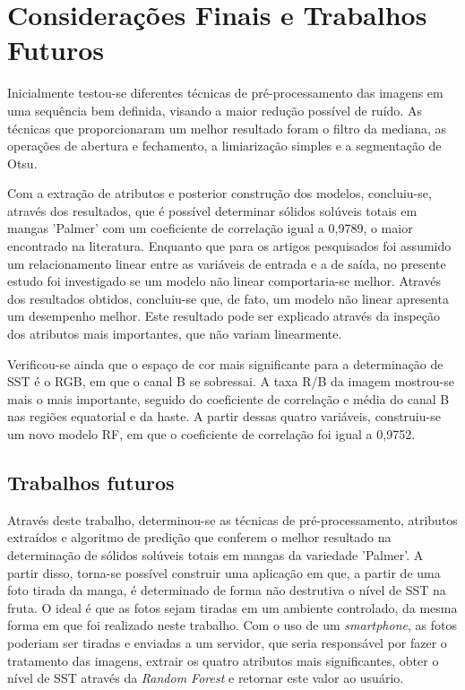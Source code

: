 \chapter{Considerações Finais e Trabalhos Futuros}

Inicialmente testou-se diferentes técnicas de pré-processamento das imagens em uma sequência bem definida, visando a maior redução possível de ruído. As técnicas que proporcionaram um melhor resultado foram o filtro da mediana, as operações de abertura e fechamento, a limiarização simples e a segmentação de Otsu.

Com a extração de atributos e posterior construção dos modelos, concluiu-se, através dos resultados, que é possível determinar sólidos solúveis totais em mangas 'Palmer' com um coeficiente de correlação igual a 0,9789, o maior encontrado na literatura. Enquanto que para os artigos pesquisados foi assumido um relacionamento linear entre as variáveis de entrada e a de saída, no presente estudo foi investigado se um modelo não linear comportaria-se melhor. Através dos resultados obtidos, concluiu-se que, de fato, um modelo não linear apresenta um desempenho melhor. Este resultado pode ser explicado através da inspeção dos atributos mais importantes, que não variam linearmente.

Verificou-se ainda que o espaço de cor mais significante para a determinação de SST é o RGB, em que o canal B se sobressai. A taxa R/B da imagem mostrou-se mais o mais importante, seguido do coeficiente de correlação e média do canal B nas regiões equatorial e da haste. A partir dessas quatro variáveis, construiu-se um novo modelo RF, em que o coeficiente de correlação foi igual a 0,9752.  
 
\section{Trabalhos futuros}

Através deste trabalho, determinou-se as técnicas de pré-processamento, atributos extraídos e algoritmo de predição que conferem o melhor resultado na determinação de sólidos solúveis totais em mangas da variedade 'Palmer'. A partir disso, torna-se possível construir uma aplicação em que, a partir de uma foto tirada da manga, é determinado de forma não destrutiva o nível de SST na fruta. O ideal é que as fotos sejam tiradas em um ambiente controlado, da mesma forma em que foi realizado neste trabalho. Com o uso de um \textit{smartphone}, as fotos poderiam ser tiradas e enviadas a um servidor, que seria responsável por fazer o tratamento das imagens, extrair os quatro atributos mais significantes, obter o nível de SST através da \textit{Random Forest} e retornar este valor ao usuário.  


